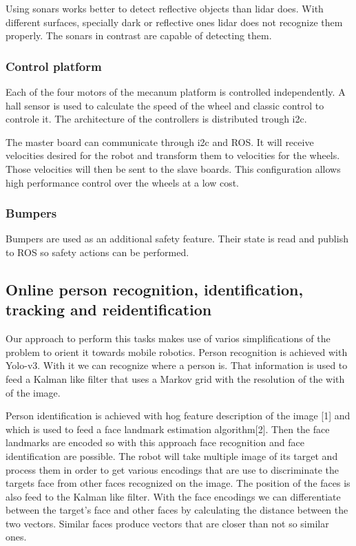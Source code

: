 Using sonars works better to detect reflective objects than lidar does.
With different surfaces, specially dark or reflective ones lidar does not recognize them properly.
The sonars in contrast are capable of detecting them.

\subsubsection{Control platform}
Each of the four motors of the mecanum platform is controlled independently.
A hall sensor is used to calculate the speed of the wheel and classic control to controle it.
The architecture of the controllers is distributed trough i2c.

The master board can communicate through i2c and ROS.
It will receive velocities desired for the robot and transform them to velocities for the wheels.
Those velocities will then be sent to the slave boards.
This configuration allows high performance control over the wheels at a low cost.

\subsubsection{Bumpers}
Bumpers are used as an additional safety feature.
Their state is read and publish to ROS so safety actions can be performed.

\subsection{Online person recognition, identification, tracking and reidentification}
Our approach to perform this tasks makes use of varios simplifications of the problem to orient it towards mobile robotics.
Person recognition is achieved with Yolo-v3.
With it we can recognize where a person is.
That information is used to feed a Kalman like filter that uses a Markov grid with the resolution of the with of the image.

Person identification is achieved with hog feature description of the image [1] and which is used to feed a face landmark estimation algorithm[2].
Then the face landmarks are encoded so with this approach face recognition and face identification are possible.
The robot will take multiple image of its target and process them in order to get various encodings that are use to discriminate the targets face from other faces recognized on the image.
The position of the faces is also feed to the Kalman like filter.
With the face encodings we can differentiate between the target's face and other faces by calculating the distance between the two vectors.
Similar faces produce vectors that are closer than not so similar ones.

